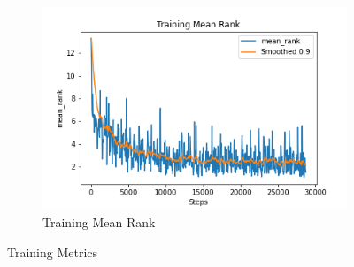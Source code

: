 \begin{figure}[ht!]
\begin{subfigure}[b]{0.3\textwidth}
         \label{fig:training_loss}
     \end{subfigure}
     \hfill
     \begin{subfigure}[b]{0.3\textwidth}
         \centering
         \includegraphics[width=\textwidth]{./figure/results/baseline_and_blindfolding/training/mean_rank.png}
         \caption{Training Mean Rank}
         \label{fig:training_mean_rank}
     \end{subfigure}
     \caption{Training Metrics}
     \label{fig:training_metrics}
\end{figure}

